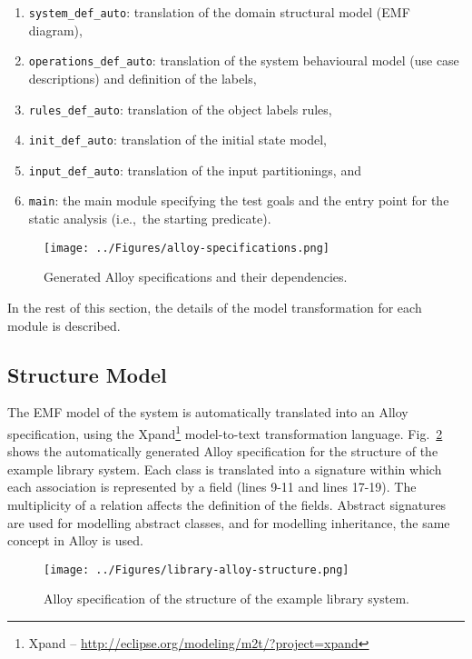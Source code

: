 \begin{enumerate}
	\item \texttt{system\_def\_auto}: translation of the domain structural model (EMF diagram),
	\item \texttt{operations\_def\_auto}: translation of the system behavioural model (use case descriptions) and definition of the labels,
	\item \texttt{rules\_def\_auto}: translation of the object labels rules,
	\item \texttt{init\_def\_auto}: translation of the initial state model, 
	\item \texttt{input\_def\_auto}: translation of the input partitionings, and
	\item \texttt{main}: the main module specifying the test goals and the entry point for the static analysis (i.e.,\ the starting predicate).
\end{enumerate}

\begin{figure}[h]
\centering
\texttt{[image: ../Figures/alloy-specifications.png]}
\caption{Generated Alloy specifications and their dependencies.}
\label{fig:alloy-specifications}
\end{figure}

In the rest of this section, the details of the model transformation for each module is described.

\subsection{Structure Model}
\label{sec:alloy-structure}
The EMF model of the system is automatically translated into an Alloy specification, using the Xpand\footnote{Xpand – \url{http://eclipse.org/modeling/m2t/?project=xpand}} model-to-text transformation language. Fig.~\ref{fig:library-alloy-structure} shows the automatically generated Alloy specification for the structure of the example library system. Each class is translated into a signature within which each association is represented by a field (lines 9-11 and lines 17-19). The multiplicity of a relation affects the definition of the fields. Abstract signatures are used for modelling abstract classes, and for modelling inheritance, the same concept in Alloy is used.

\begin{figure}[h]
\centering
\texttt{[image: ../Figures/library-alloy-structure.png]}
\caption{Alloy specification of the structure of the example library system.}
\label{fig:library-alloy-structure}
\end{figure}

